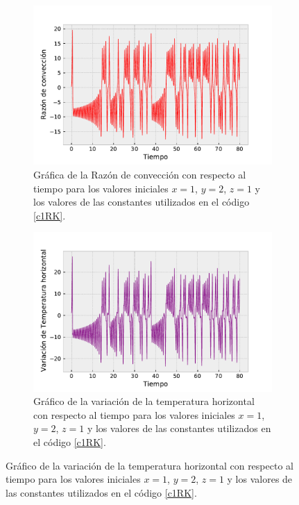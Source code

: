 \documentclass[../portafolio.tex]{subfiles}
\begin{document}
\begin{figure}[h]
    \centering
    \begin{subfigure}[b]{0.3\textwidth}
        \centering
        \includegraphics[width=\textwidth]{tex/img/ej2_RK_graf00.pdf}
        \caption{Gráfica de la Razón de convección con respecto al tiempo para los valores iniciales $x=1$, $y=2$, $z=1$ y los valores de las constantes utilizados en el código \ref{c1RK}.}
        \label{RKgraf4}
    \end{subfigure}
    \hfill
    \begin{subfigure}[b]{0.3\textwidth}
        \centering
        \includegraphics[width=\textwidth]{tex/img/ej2_RK_graf01.pdf}
        \caption{Gráfico de la variación de la temperatura horizontal con respecto al tiempo para los valores iniciales $x=1$, $y=2$, $z=1$ y los valores de las constantes utilizados en el código \ref{c1RK}.}
        \label{RKgraf5}

\end{subfigure}
\end{figure}
\end{document}
